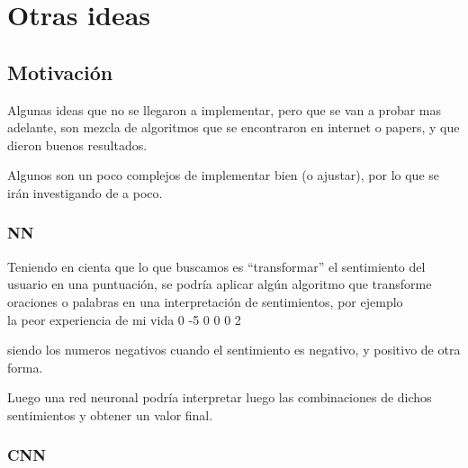 
\chapter{Otras ideas} %

\label{other_ideas} %


\section{Motivaci\'on}

Algunas ideas que no se llegaron a implementar, pero que se van a probar mas adelante, son mezcla
de algoritmos que se encontraron en internet o papers, y que dieron buenos resultados.

Algunos son un poco complejos de implementar bien (o ajustar), por lo que se ir\'an investigando
de a poco.


\subsection{NN}

Teniendo en cienta que lo que buscamos es ``transformar'' el sentimiento del usuario en una
puntuaci\'on, se podr\'ia aplicar alg\'un algoritmo que transforme oraciones o palabras en una
interpretaci\'on de sentimientos, por ejemplo\\

    la peor experiencia de mi vida
    0   -5       0       0  0   2

siendo los numeros negativos cuando el sentimiento es negativo, y positivo de otra forma.

Luego una red neuronal podr\'ia interpretar luego las combinaciones de dichos sentimientos y obtener
un valor final.

\subsection{CNN}


